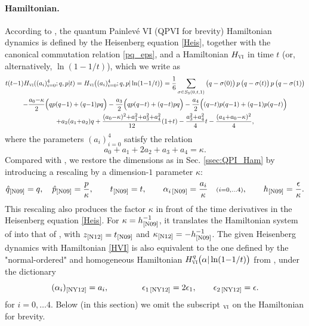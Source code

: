 \documentclass[12pt,a4paper]{article}
\numberwithin{equation}{section}
\newcommand{\VI}{\scalebox{.6}{VI}}
\begin{document}
\paragraph{Hamiltonian.} 

According to \cite[\S 3]{N09}, the quantum Painlev\'e VI  (QPVI for brevity) Hamiltonian dynamics is defined by the Heisenberg equation \eqref{Heis}, together with the canonical commutation relation \eqref{pq_eps}, and a Hamiltonian $H_{\VI}$ in time $t$ (or, alternatively, $\ln (1{-}1/t)$), which we write as 
\begin{multline}\label{HVI}
t(t{-}1)H_{\VI}((a_i)_{i=0}^4;q,p|t)=H_{\VI}\big((a_i)_{i=0}^4;q,p|\ln (1{-}1/t)\big)=\frac16\sum_{\sigma\in S_3(0,t,1)}\big(q-\sigma(0)\big)\,p\,\big(q-\sigma(t)\big)\,p\,\big(q-\sigma(1)\big)\\-\frac{a_0{-}\kappa}2\Big(qp(q{-}1)+(q{-}1)pq\Big)-\frac{a_3}2\Big(qp(q{-}t)+(q{-}t)pq\Big)-\frac{a_4}2\Big((q{-}t)p(q{-}1)+(q{-}1)p(q{-}t)\Big)\\
+a_2(a_1{+}a_2)q+
\frac{(a_0{-}\kappa)^2{+}a_1^2{+}a_3^2{+}a_4^2}{12}(1{+}t)-\frac{a_3^2{+}a_4^2}4t-\frac{(a_4{+}a_0{-}\kappa)^2}4,
\end{multline}
where the parameters $(a_i)_{i=0}^4$ satisfy the relation 
\begin{equation}\label{D4_imrv}
a_0+a_1+2a_2+a_3+a_4=\kappa.
\end{equation}
Compared with \cite[\S 3]{N09}, we restore the dimensions as in Sec. \ref{ssec:QPI_Ham} by introducing a rescaling by a dimension-$1$ parameter $\kappa$:
\begin{equation}
\hat{q}_{\textrm{\cite{N09}}}=q, \quad \hat{p}_{\textrm{\cite{N09}}}=\frac{p}{\kappa}, \qquad t_{\textrm{\cite{N09}}}=t, \qquad 
\alpha_{i\,\textrm{\cite{N09}}}=\frac{a_i}{\kappa}\quad {\scriptstyle (i=0,\ldots 4)}, \qquad h_{\textrm{\cite{N09}}}=\frac{\epsilon}{\kappa}.
\end{equation}
This rescaling also produces
the factor $\kappa$ in front of the time derivatives in the Heisenberg equation \eqref{Heis}. For $\kappa=h_{\textrm{\cite{N09}}}^{-1}$, it translates the Hamiltonian system of \cite[\S 3]{N09} into that of \cite[Sec. 2]{N12}, with $z_{\textrm{\cite{N12}}}=t_{\textrm{\cite{N09}}}$ and $\kappa_{\textrm{\cite{N12}}}=-h_{\textrm{\cite{N09}}}^{-1}$.
The given Heisenberg dynamics with Hamiltonian \eqref{HVI} is also equivalent to the one defined by the "normal-ordered" and homogeneous Hamiltonian $H^q_{\VI}\big(\alpha|\ln (1{-}1/t)\big)$ from \cite[Sec. 2.1]{NY12}, under the dictionary
\begin{equation}\label{NY12_eps}
(\alpha_i)_{\textrm{\cite{NY12}}}=a_i, \qquad \qquad \epsilon_{1\,\textrm{\cite{NY12}}}=2\epsilon_1,\qquad \epsilon_{2\,\textrm{\cite{NY12}}}=\epsilon.    
\end{equation}
for $i=0,\ldots 4$. Below (in this section) we omit the subscript $_{\VI}$ on the Hamiltonian for brevity.
\end{document}
